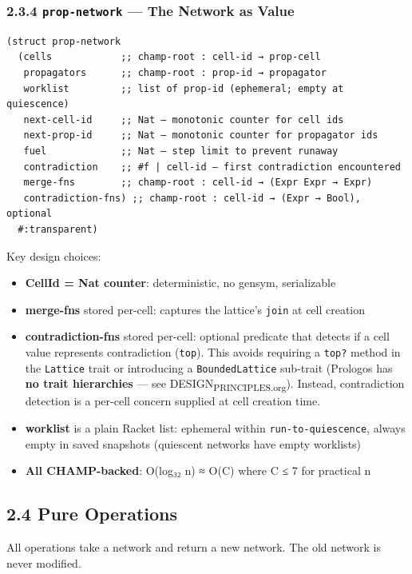 \documentclass[11pt]{article}
\begin{document}
\subsubsection{2.3.4 \texttt{prop-network} — The Network as Value}
\label{sec:org7c91312}

\begin{verbatim}
(struct prop-network
  (cells            ;; champ-root : cell-id → prop-cell
   propagators      ;; champ-root : prop-id → propagator
   worklist         ;; list of prop-id (ephemeral; empty at quiescence)
   next-cell-id     ;; Nat — monotonic counter for cell ids
   next-prop-id     ;; Nat — monotonic counter for propagator ids
   fuel             ;; Nat — step limit to prevent runaway
   contradiction    ;; #f | cell-id — first contradiction encountered
   merge-fns        ;; champ-root : cell-id → (Expr Expr → Expr)
   contradiction-fns) ;; champ-root : cell-id → (Expr → Bool), optional
  #:transparent)
\end{verbatim}

Key design choices:
\begin{itemize}
\item \textbf{CellId = Nat counter}: deterministic, no gensym, serializable
\item \textbf{merge-fns} stored per-cell: captures the lattice's \texttt{join} at cell creation
\item \textbf{contradiction-fns} stored per-cell: optional predicate that detects if a cell
value represents contradiction (\texttt{top}). This avoids requiring a \texttt{top?} method
in the \texttt{Lattice} trait or introducing a \texttt{BoundedLattice} sub-trait (Prologos
has \textbf{no trait hierarchies} — see DESIGN\textsubscript{PRINCIPLES.org}). Instead, contradiction
detection is a per-cell concern supplied at cell creation time.
\item \textbf{worklist} is a plain Racket list: ephemeral within \texttt{run-to-quiescence},
always empty in saved snapshots (quiescent networks have empty worklists)
\item \textbf{All CHAMP-backed}: O(log₃₂ n) ≈ O(C) where C ≤ 7 for practical n
\end{itemize}
\subsection{2.4 Pure Operations}
\label{sec:org8b81fce}

All operations take a network and return a new network. The old network
is never modified.
\end{document}
